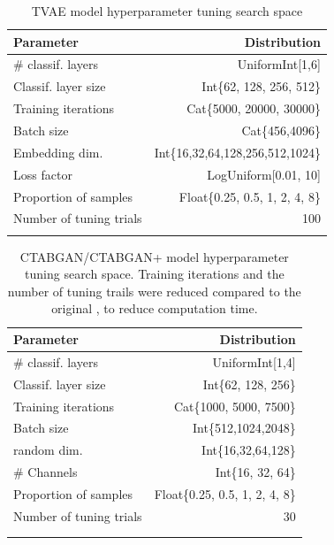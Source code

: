 \begin{table}[H]
	\centering
	\begin{tabular}{lr}
		\toprule
		Parameter               & Distribution                     \\
		\midrule
		\# classif. layers      & UniformInt[1,6]                  \\
		Classif. layer size     & Int\{62, 128, 256, 512\}         \\
		Training iterations    & Cat\{5000, 20000, 30000\}        \\
		Batch size              & Cat\{456,4096\}                  \\
		Embedding dim.          & Int\{16,32,64,128,256,512,1024\} \\
		Loss factor             & LogUniform[0.01, 10]             \\
		Proportion of samples   & Float\{0.25, 0.5, 1, 2, 4, 8\}   \\
		\midrule
		Number of tuning trials & 100                              \\
		\bottomrule
		\multicolumn{2}{c}{}\\[-0.6em]
	\end{tabular}
	\caption[TVAE Hyperparameter Search Space]{TVAE model hyperparameter tuning search space \cite{kotelnikov2022TabDDPMModellingTabular}}
	\label{tab:tvae_tune}
\end{table}

\begin{table}[H]
	\centering
	\begin{tabular}{lr}
		\toprule
		Parameter               & Distribution                   \\
		\midrule
		\# classif. layers      & UniformInt[1,4]                \\
		Classif. layer size     & Int\{62, 128, 256\}            \\
		Training iterations    & Cat\{1000, 5000, 7500\}        \\
		Batch size              & Int\{512,1024,2048\}           \\
		random dim.             & Int\{16,32,64,128\}            \\
		\# Channels             & Int\{16, 32, 64\}              \\
		Proportion of samples   & Float\{0.25, 0.5, 1, 2, 4, 8\} \\
		\midrule
		Number of tuning trials & 30                             \\
		\bottomrule
		\multicolumn{2}{c}{}\\[-0.6em]
		\multicolumn{2}{c}{}\\[-0.6em] %
	\end{tabular}
	\caption[CTABGAN(+) Hyperparameter Search Space]{CTABGAN/CTABGAN+ model hyperparameter tuning search space. Training iterations and the number of tuning trails were reduced compared to the original \cite{kotelnikov2022TabDDPMModellingTabular}, to reduce computation time.}
	\label{tab:ctabgan_tune}
\end{table}

